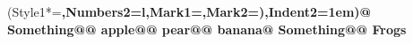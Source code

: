 \documentclass[preview]{standalone}
\begin{document}
\begin{center}
\begin{easylist}\ListProperties(Style1*=\bfseries,Numbers2=l,Mark1={},Mark2={)},Indent2=1em)@ Something@@ apple@@ pear@@ banana@ Something@@ Frogs\end{easylist}
\end{center}
\end{document}
